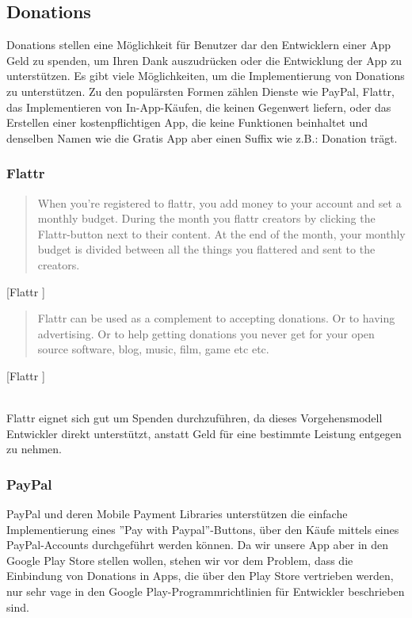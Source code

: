 \documentclass[FIPLY_base.tex]{subfiles}
\begin{document}
\subsection{Donations}
Donations stellen eine Möglichkeit für Benutzer dar den Entwicklern einer App Geld zu spenden, um Ihren Dank auszudrücken oder die Entwicklung der App zu unterstützen.
Es gibt viele Möglichkeiten, um die Implementierung von Donations zu unterstützen.\newline
Zu den populärsten Formen zählen Dienste wie PayPal, Flattr, das Implementieren von In-App-Käufen, die keinen Gegenwert liefern, oder das Erstellen einer kostenpflichtigen App, die keine Funktionen beinhaltet und denselben Namen wie die Gratis App aber einen Suffix wie z.B.: Donation trägt.


\subsubsection{Flattr}
\begin{quote}
When you're registered to flattr, you add money to your account and set a monthly budget. During the month you flattr creators by clicking the Flattr-button next to their content. At the end of the month, your monthly budget is divided between all the things you flattered and sent to the creators.
\end{quote}[Flattr \cite{flattr}]

\begin{quote}
Flattr can be used as a complement to accepting donations. Or to having advertising. Or to help getting donations you never get for your open source software, blog, music, film, game etc etc.
\end{quote}[Flattr \cite{flattr}]

\ \\
Flattr eignet sich gut um Spenden durchzuführen, da dieses Vorgehensmodell Entwickler direkt unterstützt, anstatt Geld für eine bestimmte Leistung entgegen zu nehmen. 

\newpage
\subsubsection{PayPal}
PayPal und deren Mobile Payment Libraries unterstützen die einfache Implementierung eines ''Pay with Paypal''-Buttons, über den Käufe mittels eines PayPal-Accounts durchgeführt werden können.
Da wir unsere App aber in den Google Play Store stellen wollen, stehen wir vor dem Problem, dass die Einbindung von Donations in Apps, die über den Play Store vertrieben werden, nur sehr vage in den Google Play-Programmrichtlinien für Entwickler beschrieben sind.
\end{document}
